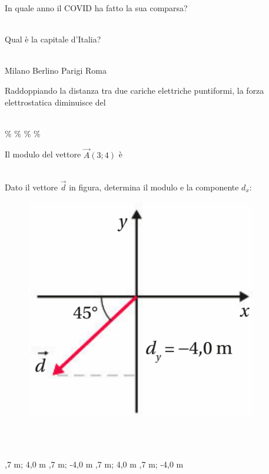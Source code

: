 \documentclass[a4paper,11pt]{exam}
\begin{document}
        \begin{center} 
        \end{center}
\begin{questions}

    
\question In quale anno il COVID ha fatto la sua comparsa?\\\
\begin{oneparchoices}
\end{oneparchoices}

    
\question Qual è la capitale d’Italia?\\\
\begin{oneparchoices}
  \choice Milano
  \choice Berlino
  \choice Parigi
  \choice Roma
\end{oneparchoices}

    
\question Raddoppiando la distanza tra due cariche elettriche puntiformi, la forza elettrostatica diminuisce del\\\
\begin{oneparchoices}
  \choice 90\%
  \choice 25\%
  \%
  \%
\end{oneparchoices}

    
\question Il modulo del vettore $\vec{A}(3;4)$ è\\\
\begin{oneparchoices}
  \choice 8
  \choice 12
\end{oneparchoices}

    
\question Dato il vettore $\vec{d}$ in figura, determina il modulo e la componente $d_x$: \begin{figure}[h!]   \begin{center}     \includegraphics[scale=0.35]{vettored.png}   \end{center} \end{figure}\\\
\begin{oneparchoices}
  ,7 m; 4,0 m
  \choice -5,7 m; -4,0 m
  \choice -5,7 m; 4,0 m
  \choice 5,7 m; -4,0 m
\end{oneparchoices}


\end{questions}
\end{document}
